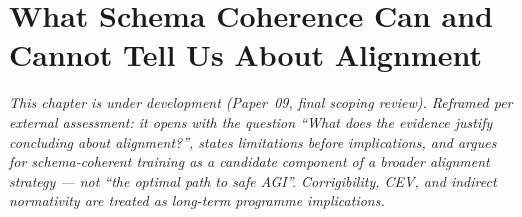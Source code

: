 \chapter{What Schema Coherence Can and Cannot Tell Us About Alignment}
\label{ch:implications}

\textit{This chapter is under development (Paper~09, final scoping review). Reframed
per external assessment: it opens with the question ``What does the evidence justify
concluding about alignment?'', states limitations before implications, and argues for
schema-coherent training as a \emph{candidate component} of a broader alignment
strategy — not ``the optimal path to safe AGI''. Corrigibility, CEV, and indirect
normativity are treated as long-term programme implications.}
